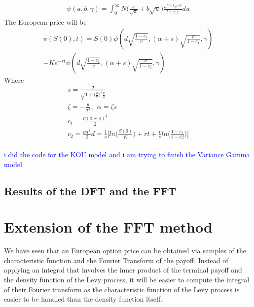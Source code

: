 \documentclass[12pt]{report}
\begin{document}
\begin{gather} 
\psi(a,b,\gamma)=\int_{0}^{\infty} N\big(\frac{a}{\sqrt{u}}+ b \sqrt{u} \big) \frac{u^{\gamma-1} e^{-u}}{\Gamma(\gamma)}du
\end{gather}
The European price will be 
\begin{align}
\label{rmeukou}
\pi(S(0),t)=S(0)\psi(d \sqrt{\frac{1-c_1}{\nu}},(\alpha+s)\sqrt{\frac{\nu}{1-c_1}},\gamma) \nonumber \\
-Ke^{-rt}\psi(d \sqrt{\frac{1-c_2}{\nu}},(\alpha+s)\sqrt{\frac{\nu}{1-c_2}},\gamma) 
\end{align}
Where 
\begin{gather*}
s=\frac{\sigma}{\sqrt{1+\big(\frac{\theta}{\sigma}\big)^2 \frac{\nu}{2}}}\\
\zeta=-\frac{\theta }{\sigma^2},~~\alpha=\zeta s \\
c_1=\frac{\nu(\alpha+s)^2}{2}\\
c_2=\frac{\nu \alpha^2}{2}
d=\frac{1}{s}\big[ ln\big(\frac{S(0)}{K}\big)+rt+\frac{t}{\nu} ln \big( \frac{1-c_1}{1-c2}\big)\big]\\
\end{gather*}

\textcolor{blue}{i did the code for the KOU model and i am trying to finish the Variance Gamma model} 

\section{Results of the DFT and the FFT}
\chapter{Extension of the FFT method }

We have seen that an European option price can be obtained via samples of the characteristic function and the Fourier Transform of the payoff. Instead of applying an integral that involves the inner product of the terminal payoff and the density function of the Levy process, it will be easier to compute the integral of their Fourier transform as the characteristic function  of the Levy process is easier to be handled than the density function itself.\\
\end{document}
